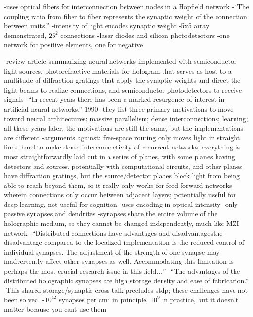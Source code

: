 \cite{itki1989}
-uses optical fibers for interconnection between nodes in a Hopfield network
-``The coupling ratio from fiber to fiber represents the synaptic weight of the connection between units.''
-intensity of light encodes synaptic weight
-5x5 array demonstrated, $25^2$ connections
-laser diodes and silicon photodetectors
-one network for positive elements, one for negative 

\cite{psbr1990}
-review article summarizing neural networks implemented with semiconductor light sources, photorefractive materials for hologram that serves as host to a multitude of diffraction gratings that apply the synaptic weights and direct the light beams to realize connections, and semiconductor photodetectors to receive signals
-``In recent years there has been a marked resurgence of interest in artificial neural networks.'' 1990
-they list three primary motivations to move toward neural architectures: massive parallelism; dense interconnections; learning; all these years later, the motivations are still the same, but the implementations are different
-arguments against: free-space routing only moves light in straight lines, hard to make dense interconnectivity of recurrent networks, everything is most straightforwardly laid out in a series of planes, with some planes having detectors and sources, potentially with computational circuits, and other planes have diffraction gratings, but the source/detector planes block light from being able to reach beyond them, so it really only works for feed-forward networks wherein connections only occur between adjacent layers; potentially useful for deep learning, not useful for cognition
-uses encoding in optical intensity
-only passive synapses and dendrites
-synapses share the entire volume of the holographic medium, so they cannot be changed independently, much like MZI network
-``Distributed connections have advantages and disadvantages\textemdash the disadvantage compared to the localized implementation is the reduced control of individual synapses. The adjustment of the strength of one synapse may inadvertently affect other synapses as well. Accommodating this limitation is perhaps the most crucial research issue in this field....''
-``The advantages of the distributed holographic synapses are high storage density and ease of fabrication.''
-This shared storage/synaptic cross talk precludes stdp; these challenges have not been solved.
-$10^{12}$ synapses per cm$^3$ in principle, $10^9$ in practice, but it doesn't matter because you cant use them
